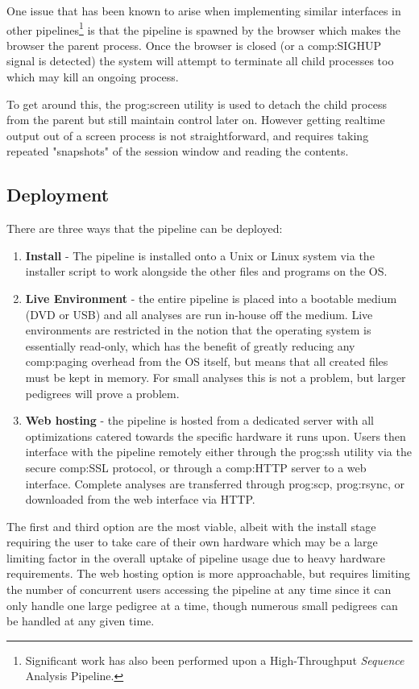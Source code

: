 One issue that has been known to arise when implementing similar interfaces in other pipelines\footnote{Significant work has also been performed upon a High-Throughput \textit{Sequence} Analysis Pipeline.} is that the pipeline is spawned by the browser which makes the browser the parent process. Once the browser is closed (or a \gls{comp:SIGHUP} signal is detected) the system will attempt to terminate all child processes too which may kill an ongoing process.

To get around this, the \gls{prog:screen} utility is used to detach the child process from the parent but still maintain control later on. However getting realtime output out of a screen process is not straightforward, and requires taking repeated "snapshots" of the session window and reading the contents.


\subsection{Deployment}

There are three ways that the pipeline can be deployed:
\begin{enumerate}
\item{{\bf Install} - The pipeline is installed onto a Unix or Linux system via the installer script to work alongside the other files and programs on the OS.}
\item{{\bf Live Environment} - the entire pipeline is placed into a bootable medium (DVD or USB) and all analyses are run in-house off the medium. Live environments are restricted in the notion that the operating system is essentially read-only, which has the benefit of greatly reducing any \gls{comp:paging} overhead from the OS itself, but means that all created files must be kept in memory. For small analyses this is not a problem, but larger pedigrees will prove a problem.}
\item{{\bf Web hosting} - the pipeline is hosted from a dedicated server with all optimizations catered towards the specific hardware it runs upon. Users then interface with the pipeline remotely either through the \gls{prog:ssh} utility via the secure \gls{comp:SSL} protocol, or through a \gls{comp:HTTP} server to a web interface. Complete analyses are transferred through \gls{prog:scp}, \gls{prog:rsync}, or downloaded from the web interface via HTTP.}
\end{enumerate}

The first and third option are the most viable, albeit with the install stage requiring the user to take care of their own hardware which may be a large limiting factor in the overall uptake of pipeline usage due to heavy hardware requirements. The web hosting option is more approachable, but requires limiting the number of concurrent users accessing the pipeline at any time since it can only handle one large pedigree at a time, though numerous small pedigrees can be handled at any given time.



